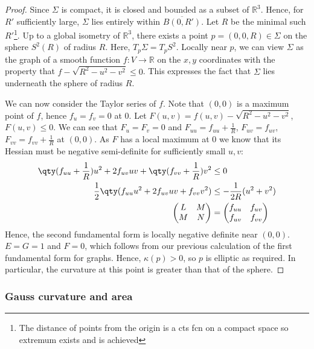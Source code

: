 \begin{proof}
	Since $\Sigma$ is compact, it is closed and bounded as a subset of $\mathbb R^3$.
	Hence, for $R'$ sufficiently large, $\Sigma$ lies entirely within $\overline{B(0,R')}$.
	Let $R$ be the minimal such $R'$\footnote{The distance of points from the origin is a cts fcn on a compact space so extremum exists and is achieved}.
	Up to a global isometry of $\mathbb R^3$, there exists a point $p = (0,0,R) \in \Sigma$ on the sphere $S^2(R)$ of radius $R$.
	Here, $T_p \Sigma = T_p S^2$.
	Locally near $p$, we can view $\Sigma$ as the graph of a smooth function $f \colon V \to \mathbb R$ on the $x, y$ coordinates with the property that $f - \sqrt{R^2 - u^2 - v^2} \leq 0$.
	This expresses the fact that $\Sigma$ lies underneath the sphere of radius $R$.

	We can now consider the Taylor series of $f$.
	Note that $(0,0)$ is a maximum point of $f$, hence $f_u = f_v = 0$ at $0$.
	Let $F(u, v) = f(u, v) - \sqrt{R^2 - u^2 - v^2}$, $F(u, v) \leq 0$.
	We can see that $F_u = F_v = 0$ and $F_{uu} = f_{uu} + \frac{1}{R}$, $F_{uv} = f_{uv}$, $F_{vv} = f_{vv} + \frac{1}{R}$ at $(0, 0)$.
	As $F$ has a local maximum at $0$ we know that its Hessian must be negative semi-definite for sufficiently small $u,v$:
	\begin{align*}
		\qty(f_{uu} + \frac{1}{R})u^2 + 2 f_{uv} uv + \qty(f_{vv} + \frac{1}{R}) v^2 &\leq 0 \\ 
		\frac{1}{2} \qty(f_{uu} u^2 + 2f_{uv} uv + f_{vv} v^2) &\leq -\frac{1}{2R} (u^2 + v^2) \\
		\begin{pmatrix}L & M \\M & N\end{pmatrix} &= \begin{pmatrix}f_{uu} & f_{uv} \\f_{uv} & f_{vv}\end{pmatrix}
	\end{align*}
	Hence, the second fundamental form is locally negative definite near $(0,0)$.
	$E = G = 1$ and $F = 0$, which follows from our previous calculation of the first fundamental form for graphs.
	Hence, $\kappa(p) > 0$, so $p$ is elliptic as required.
	In particular, the curvature at this point is greater than that of the sphere.
\end{proof}

\subsubsection{Gauss curvature and area}

